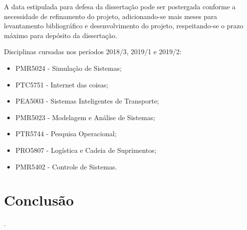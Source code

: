 	A data estipulada para defesa da dissertação pode ser postergada conforme a necessidade de refinamento do projeto, adicionando-se mais meses para levantamento bibliográfico e desenvolvimento do projeto, respeitando-se o prazo máximo para depósito da dissertação. 
	
	Disciplinas cursadas nos períodos 2018/3, 2019/1 e 2019/2:
	\begin{itemize}
		\item PMR5024 - Simulação de Sistemas;
		\item PTC5751 - Internet das coisas;
		\item PEA5003 - Sistemas Inteligentes de Transporte;
		\item PMR5023 - Modelagem e Análise de Sistemas;
		\item PTR5744 - Pesquisa Operacional;
		\item PRO5807 - Logística e Cadeia de Suprimentos;
		\item PMR5402 - Controle de Sistemas.
	\end{itemize}

	


\chapter{Conclusão}
\label{cha:conclusao}
	\lipsum[1-1]
	.